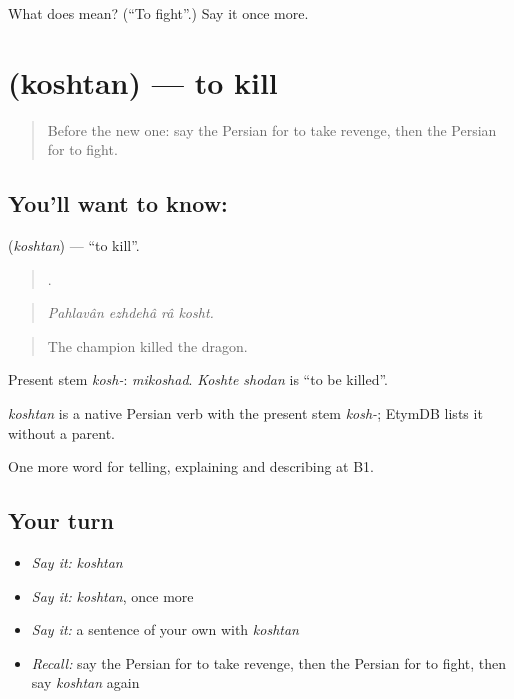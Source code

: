 \begin{tcolorbox}[breakable,colback=teal!4,colframe=teal!35!black,title={Before you move on}]
What does  mean? (\textquotedblleft{}To fight\textquotedblright{}.) Say it once more.
\end{tcolorbox}
\section[\texorpdfstring{\fa{کشتن} (koshtan)}{کشتن (koshtan)}]{ (koshtan) — to kill}

\label{lesson:FA-C349-koshtan}



\begin{quote}
Before the new one: say the Persian for to take revenge, then the Persian for to fight.
\end{quote}

\subsection*{You'll want to know: }
\textbf{} (\emph{koshtan}) — \textquotedblleft{}to kill\textquotedblright{}.

\begin{quote}
   .
\end{quote}

\begin{quote}
\emph{Pahlavân ezhdehâ râ kosht.}
\end{quote}

\begin{quote}
The champion killed the dragon.
\end{quote}

Present stem \emph{kosh-}: \emph{mikoshad}. \emph{Koshte shodan} is \textquotedblleft{}to be killed\textquotedblright{}.

\begin{cousinweb}
\emph{koshtan} is a native Persian verb with the present stem \emph{kosh-}; EtymDB lists it without a parent.
\end{cousinweb}

\begin{grammarlens}[title={What you've built}]
One more word for telling, explaining and describing at B1.
\end{grammarlens}

\subsection*{Your turn}
\begin{itemize}
\raggedright
  \item \emph{Say it:} \emph{koshtan}
  \item \emph{Say it:} \emph{koshtan}, once more
  \item \emph{Say it:} a sentence of your own with \emph{koshtan}
  \item \emph{Recall:} say the Persian for to take revenge, then the Persian for to fight, then say \emph{koshtan} again
\end{itemize}

